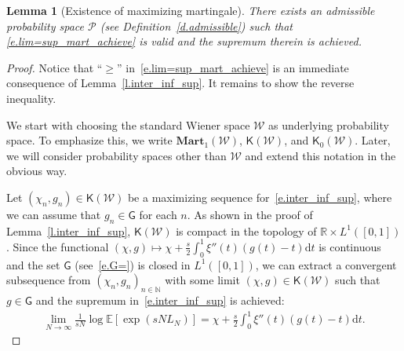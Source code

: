\documentclass[11pt]{amsart}
\newtheorem{lemma}[proposition]{Lemma}
\theoremstyle{remark}
\theoremstyle{definition}
\numberwithin{equation}{section}
\numberwithin{proposition}{section}
\numberwithin{figure}{section}
\numberwithin{table}{section}
\newcommand{\N}{\mathbb{N}}
\newcommand{\R}{\mathbb{R}}
\newcommand{\E}{\mathbb{E}}
\renewcommand{\geq}{\geqslant}
\newcommand{\Ll}{\left}
\newcommand{\Rr}{\right}
\renewcommand{\d}{\mathrm{d}}
\newcommand{\1}{\mathbf{1}}
\newcommand{\msf}{\mathsf}
\newcommand{\msc}{\mathscr}
\newcommand{\bmart}{\mathbf{Mart}}
\begin{document}
\begin{lemma}[Existence of maximizing martingale]\label{l.lim=sup_mart_achieve}
There exists an admissible probability space $\mathscr P$ (see Definition~\ref{d.admissible}) such that \eqref{e.lim=sup_mart_achieve} is valid and the supremum therein is achieved.
\end{lemma}

\begin{proof}
Notice that ``$\geq$'' in~\eqref{e.lim=sup_mart_achieve} is an immediate consequence of Lemma~\ref{l.inter_inf_sup}. It remains to show the reverse inequality.

We start with choosing the standard Wiener space $\msc W$ as underlying probability space. To emphasize this, we write $\bmart_1(\msc W)$, $\msf K(\msc W)$, and $\msf K_0(\msc W)$.
Later, we will consider probability spaces other than $\msc W$ and extend this notation in the obvious way.

Let $(\chi_n,g_n)\in\msf K(\msc W)$ be a maximizing sequence for~\eqref{e.inter_inf_sup}, where we can assume that $g_n\in\msf G$ for each $n$. As shown in the proof of Lemma~\ref{l.inter_inf_sup}, $\msf K(\msc W)$ is compact in the topology of $\R\times L^1([0,1])$. Since the functional $(\chi,g)\mapsto \chi + \frac{s}{2}\int_0^1\xi''(t)(g(t)-t)\d t$ is continuous and the set $\msf G$ (see~\eqref{e.G=}) is closed in $L^1([0,1])$, we can extract a convergent subsequence from $(\chi_n,g_n)_{n\in\N}$ with some limit $(\chi,g)\in \msf K(\msc W)$ such that $g\in \msf G$ and the supremum in~\eqref{e.inter_inf_sup} is achieved:
\begin{align}\label{e.limL=chi+s}
    \lim_{N\to \infty} \frac{1}{sN} \log \E \Ll[ \exp(sN L_N) \Rr] = \chi+\frac{s}{2}\int_0^1 \xi''(t)\Ll(g(t) -t \Rr)\d t.
\end{align}


\end{proof}
\end{document}
